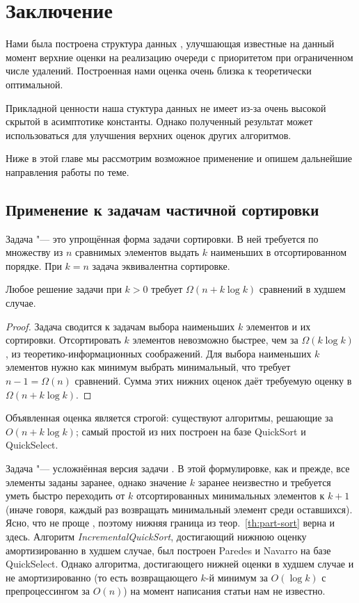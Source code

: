 \chapter{Заключение} \label{chapt3}

Нами была построена структура данных \CH, улучшающая известные на данный момент
верхние оценки на реализацию очереди с приоритетом при ограниченном
числе удалений. Построенная нами оценка очень близка к теоретически оптимальной.

Прикладной ценности наша стуктура данных не имеет из-за очень высокой скрытой
в асимптотике константы. Однако полученный результат может использоваться
для улучшения верхних оценок других алгоритмов.

Ниже в этой главе мы рассмотрим возможное применение \CH и 
опишем дальнейшие направления работы по теме.

\section{Применение к задачам частичной сортировки}

Задача \PartSort "--- это упрощённая форма задачи сортировки.\cite{partial-sort}
В ней требуется по множеству из $n$ сравнимых элементов выдать $k$ наименьших
в отсортированном порядке. При $k=n$ задача \PartSort эквивалентна сортировке.

\begin{theorem} \label{th:part-sort}
Любое решение задачи \PartSort при $k > 0$ требует $\Omega(n + k \log k)$ сравнений
в худшем случае.
\end{theorem}
\begin{proof}
Задача \PartSort сводится к задачам выбора наименьших $k$ элементов
и их сортировки. Отсортировать $k$ элементов невозможно быстрее,
чем за $\Omega(k \log k)$, из теоретико-информационных соображений\cite[с.~222]{Cormen}.
Для выбора наименьших
$k$ элементов нужно как минимум выбрать минимальный, что
требует $n-1 = \Omega(n)$ сравнений. Сумма этих нижних оценок даёт требуемую
оценку в $\Omega(n+k\log k)$.
\end{proof}

Объявленная оценка является строгой: существуют алгоритмы, решающие
\PartSort за $O(n + k \log k)$; самый простой из них построен на базе
QuickSort и QuickSelect.

Задача \IncSort "--- усложнённая версия задачи \PartSort. В этой формулировке,
как и прежде, все элементы заданы заранее, однако значение $k$ заранее неизвестно
и требуется уметь быстро переходить от $k$ отсортированных минимальных элементов
к $k+1$ (иначе говоря, каждый раз возвращать минимальный элемент среди
оставшихся). Ясно, что \IncSort не проще \PartSort, поэтому нижняя
граница из теор.~\ref{th:part-sort} верна и здесь.
Алгоритм \emph{IncrementalQuickSort}\cite{opt-inc-sort},
достигающий нижнюю оценку амортизированно в худшем случае,
был построен Paredes и Navarro на базе QuickSelect.
Однако алгоритма, достигающего нижней оценки в худшем случае и не амортизированно
(то есть возвращающего $k$-й минимум за $O(\log k)$ с препроцессингом
за $O(n)$) на момент написания статьи нам не известно.

